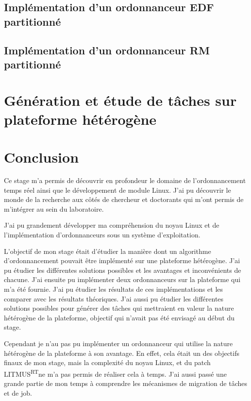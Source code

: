 \documentclass{article}
\newcommand{\litmus}{LITMUS\textsuperscript{RT}}
\begin{document}
    \subsection{Implémentation d'un ordonnanceur EDF partitionné}
    
    
    
    \subsection{Implémentation d'un ordonnanceur RM partitionné}

    
    
    
    \newpage
    \section[Génération de tâches]{Génération et étude de tâches sur plateforme hétérogène}

    


    \newpage
    \section{Conclusion}

    Ce stage m'a permis de découvrir en profondeur le domaine de l'ordonnancement temps réel ainsi que le développement de module Linux. J'ai pu découvrir le monde de la recherche aux côtés de chercheur et doctorants qui m'ont permis de m'intégrer au sein du laboratoire.
    
    J'ai pu grandement développer ma compréhension du noyau Linux et de l'implémentation d'ordonnanceurs sous un système d'exploitation. 

    L'objectif de mon stage était d'étudier la manière dont un algorithme d'ordonnancement pouvait être implémenté sur une plateforme hétérogène. J'ai pu étudier les différentes solutions possibles et les avantages et inconvénients de chacune. J'ai ensuite pu implémenter deux ordonnanceurs sur la plateforme qui m'a été fournie. J'ai pu étudier les résultats de ces implémentations et les comparer avec les résultats théoriques. J'ai aussi pu étudier les différentes solutions possibles pour générer des tâches qui mettraient en valeur la nature hétérogène de la plateforme, objectif qui n'avait pas été envisagé au début du stage.

    Cependant je n'au pas pu implémenter un ordonnanceur qui utilise la nature hétérogène de la plateforme à son avantage. En effet, cela était un des objectifs finaux de mon stage, mais la complexité du noyau Linux, et du patch \litmus ne m'a pas permis de réaliser cela à temps. J'ai aussi passé une grande partie de mon temps à comprendre les mécanismes de migration de tâches et de job.
\end{document}
